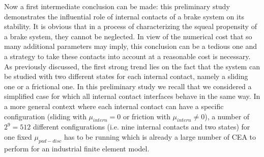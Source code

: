 \documentclass[final,1p]{elsarticle}
\begin{document}
Now a first intermediate conclusion can be made: this preliminary study demonstrates the influential role of internal contacts of a brake system on its stability. It is obvious that in a process of characterizing the squeal propensity of a brake system, they cannot be neglected. In view of the numerical cost that so many additional parameters may imply, this conclusion can be a tedious one and a strategy to take these contacts into account at a reasonable cost is necessary. As previously discussed, the first strong trend lies on the fact that the system can be studied with two different states for each internal contact, namely a sliding one or a frictional one. In this preliminary study we recall that we considered a simplified case for which all internal contact interfaces behave in the same way. In a more general context where each internal contact can have a specific configuration (sliding with $\mu_{intern} =0$ or friction with $\mu_{intern} \neq 0$), a number of $2^9=512$ different configurations (i.e. nine internal contacts and two states) for one fixed $\mu_{pad-disc}$ has to be running which is already a large number of CEA to perform for an industrial finite element model. 
\end{document}
